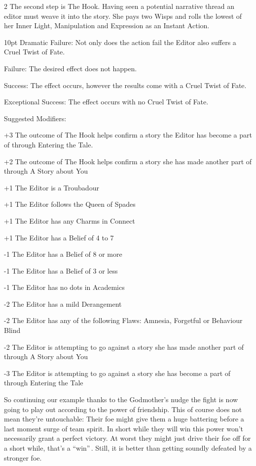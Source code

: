\begin{multicols}{2}
The second step is The Hook. Having seen a potential narrative thread an editor must weave it into the story. She pays two Wisps and rolls the lowest of her Inner Light, Manipulation and Expression as an Instant Action.

\begin{myindentpar}{10pt}    Dramatic Failure: Not only does the action fail the Editor also suffers a Cruel Twist of Fate. 

    Failure: The desired effect does not happen. 
    
    Success: The effect occurs, however the results come with a Cruel Twist of Fate. 
    
    Exceptional Success: The effect occurs with no Cruel Twist of Fate. 
    
    Suggested Modifiers:
    
+3 The outcome of The Hook helps confirm a story the Editor has become a part of through Entering the Tale.

+2 The outcome of The Hook helps confirm a story she has made another part of through A Story about You

+1 The Editor is a Troubadour

+1 The Editor follows the Queen of Spades

+1 The Editor has any Charms in Connect

+1 The Editor has a Belief of 4 to 7

-1 The Editor has a Belief of 8 or more

-1 The Editor has a Belief of 3 or less

-1 The Editor has no dots in Academics

-2 The Editor has a mild Derangement

-2 The Editor has any of the following Flaws: Amnesia, Forgetful or Behaviour Blind

-2 The Editor is attempting to go against a story she has made another part of through A Story about You

-3 The Editor is attempting to go against a story she has become a part of through Entering the Tale\end{myindentpar}

So continuing our example thanks to the Godmother's nudge the fight is now going to play out according to the power of friendship. This of course does not mean they're untouchable: Their foe might give them a huge battering before a last moment surge of team spirit. In short while they will win this power won't necessarily grant a perfect victory. At worst they might just drive their foe off for a short while, that's a \textquotedblleft win\textquotedblright\,. Still, it is better than getting soundly defeated by a stronger foe.


\end{multicols}
